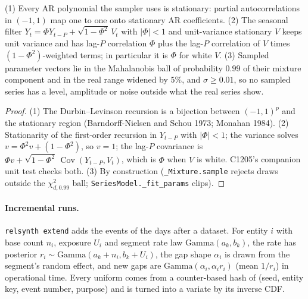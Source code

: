 \begin{proposition}\label{prop:tsseries}
(1) Every AR polynomial the sampler uses is stationary: partial autocorrelations in $(-1,1)$ map one to one onto
stationary AR coefficients. (2) The seasonal filter $Y_t=\Phi Y_{t-P}+\sqrt{1-\Phi^2}\,V_t$ with $|\Phi|<1$ and
unit-variance stationary $V$ keeps unit variance and has lag-$P$ correlation $\Phi$ plus the lag-$P$ correlation of
$V$ times $(1-\Phi^2)$-weighted terms; in particular it is $\Phi$ for white $V$. (3) Sampled parameter vectors lie in
the Mahalanobis ball of probability $0.99$ of their mixture component and in the real range widened by $5\%$, and
$\sigma\ge0.01$, so no sampled series has a level, amplitude or noise outside what the real series show.
\end{proposition}
\begin{proof}
(1) The Durbin--Levinson recursion is a bijection between $(-1,1)^p$ and the stationary region (Barndorff-Nielsen
and Schou 1973; Monahan 1984). (2) Stationarity of the first-order recursion in $Y_{t-P}$ with $|\Phi|<1$; the
variance solves $v=\Phi^2v+(1-\Phi^2)$, so $v=1$; the lag-$P$ covariance is $\Phi v+\sqrt{1-\Phi^2}\,
\operatorname{Cov}(Y_{t-P},V_t)$, which is $\Phi$ when $V$ is white. C1205's companion unit test checks both. (3) By
construction (\texttt{\_Mixture.sample} rejects draws outside the $\chi^2_{d,0.99}$ ball;
\texttt{SeriesModel.\_fit\_params} clips).
\end{proof}

\paragraph{Incremental runs.} \texttt{relsynth extend} adds the events of the days after a dataset. For entity $i$
with base count $n_i$, exposure $U_i$ and segment rate law $\mathrm{Gamma}(a_k,b_k)$, the rate has posterior
$r_i\sim\mathrm{Gamma}(a_k+n_i,b_k+U_i)$, the gap shape $\alpha_i$ is drawn from the segment's random effect, and new
gaps are $\mathrm{Gamma}(\alpha_i,\alpha_ir_i)$ (mean $1/r_i$) in operational time. Every uniform comes from a
counter-based hash of (seed, entity key, event number, purpose) and is turned into a variate by its inverse CDF.

